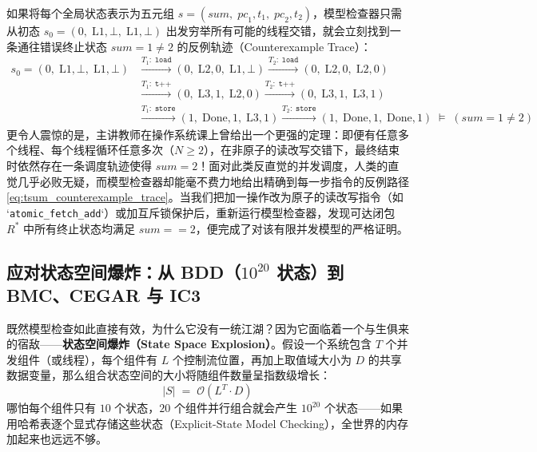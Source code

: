 \documentclass[a4paper]{article}
\begin{document}
如果将每个全局状态表示为五元组 $s = (\mathit{sum},\; \mathit{pc}_1, t_1,\; \mathit{pc}_2, t_2)$，模型检查器只需从初态 $s_0 = (0,\; \mathrm{L1}, \bot,\; \mathrm{L1}, \bot)$ 出发穷举所有可能的线程交错，就会立刻找到一条通往错误终止状态 $\mathit{sum} = 1 \neq 2$ 的反例轨迹（Counterexample Trace）：
\begin{equation}
\begin{aligned}
s_0 = (0,\; \mathrm{L1}, \bot,\; \mathrm{L1}, \bot)
&\xrightarrow{T_1:\; \texttt{load}} (0,\; \mathrm{L2}, 0,\; \mathrm{L1}, \bot)
\xrightarrow{T_2:\; \texttt{load}} (0,\; \mathrm{L2}, 0,\; \mathrm{L2}, 0) \\
&\xrightarrow{T_1:\; \texttt{t++}} (0,\; \mathrm{L3}, 1,\; \mathrm{L2}, 0)
\xrightarrow{T_2:\; \texttt{t++}} (0,\; \mathrm{L3}, 1,\; \mathrm{L3}, 1) \\
&\xrightarrow{T_1:\; \texttt{store}} (1,\; \mathrm{Done}, 1,\; \mathrm{L3}, 1)
\xrightarrow{T_2:\; \texttt{store}} (1,\; \mathrm{Done}, 1,\; \mathrm{Done}, 1) \;\models\; (\mathit{sum} = 1 \neq 2)
\end{aligned}
\label{eq:tsum_counterexample_trace}
\end{equation}
更令人震惊的是，主讲教师在操作系统课上曾给出一个更强的定理：即便有任意多个线程、每个线程循环任意多次（$N \ge 2$），在非原子的读改写交错下，最终结束时依然存在一条调度轨迹使得 $\mathit{sum} = 2$！面对此类反直觉的并发调度，人类的直觉几乎必败无疑，而模型检查器却能毫不费力地给出精确到每一步指令的反例路径 \eqref{eq:tsum_counterexample_trace}。当我们把加一操作改为原子的读改写指令（如 `\texttt{atomic\_fetch\_add}`）或加互斥锁保护后，重新运行模型检查器，发现可达闭包 $R^*$ 中所有终止状态均满足 $\mathit{sum} == 2$，便完成了对该有限并发模型的严格证明。

\subsection{应对状态空间爆炸：从 BDD（$10^{20}$ 状态）到 BMC、CEGAR 与 IC3}

既然模型检查如此直接有效，为什么它没有一统江湖？因为它面临着一个与生俱来的宿敌——\textbf{状态空间爆炸（State Space Explosion）}。假设一个系统包含 $T$ 个并发组件（或线程），每个组件有 $L$ 个控制流位置，再加上取值域大小为 $D$ 的共享数据变量，那么组合状态空间的大小将随组件数量呈指数级增长：
\begin{equation}
|S| \;=\; \mathcal{O}\!\left(L^T \cdot D\right)
\label{eq:state_explosion_complexity}
\end{equation}
哪怕每个组件只有 $10$ 个状态，$20$ 个组件并行组合就会产生 $10^{20}$ 个状态——如果用哈希表逐个显式存储这些状态（Explicit-State Model Checking），全世界的内存加起来也远远不够。
\end{document}
